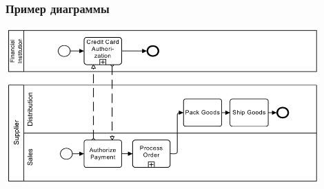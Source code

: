 \documentclass{../cscslides}
\begin{document}
    \begin{frame}
        \frametitle{Пример диаграммы}
        \begin{center}
            \includegraphics[width=0.9\textwidth]{bpmnExample.png}
        \end{center}
    \end{frame}
\end{document}
